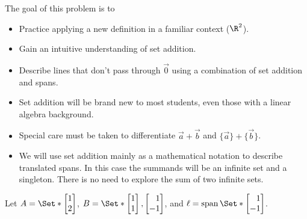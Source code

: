 \documentclass{problemset}
\begin{document}
	\question
	\begin{annotation}
		\begin{goals}

			The goal of this problem is to
			\begin{itemize}
				\item Practice applying a new definition in a familiar context ($\R^2$).
				\item Gain an intuitive understanding of set addition.
				\item Describe lines that don't pass through $\vec 0$ using
					a combination of set addition and spans.
			\end{itemize}
		\end{goals}

		\begin{notes}
			\begin{itemize}
				\item Set addition will be brand new to most students, even
					those with a linear algebra background.
				\item Special care must be taken to differentiate
					$\vec a+\vec b$ and $\{\vec a\}+\{\vec b\}$.
				\item We will use set addition mainly as a mathematical
					notation to describe translated spans. In this
					case the summands will be an infinite set
					and a singleton. There is no need to explore the sum
					of two infinite sets.
			\end{itemize}
		\end{notes}
	\end{annotation}
	Let $A=\Set*{\mat{1\\2}}$, $B=\Set*{\mat{1\\1},\mat{1\\-1}}$,
	and $\ell=\Span\Set*{\mat{1\\-1}}$.
\end{document}
